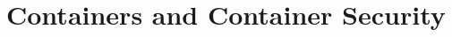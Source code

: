 %
%
%
%
%
%
%
%
%
%







\section{Containers and Container Security}%
\label{s:container-security-bg}

